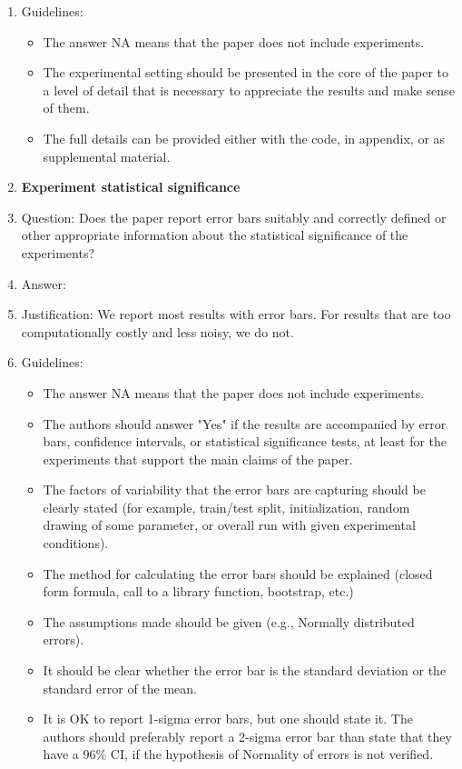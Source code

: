 \documentclass{article}
\begin{document}
\begin{enumerate}
    \item[] Guidelines:
    \begin{itemize}
        \item The answer NA means that the paper does not include experiments.
        \item The experimental setting should be presented in the core of the paper to a level of detail that is necessary to appreciate the results and make sense of them.
        \item The full details can be provided either with the code, in appendix, or as supplemental material.
    \end{itemize}
\item {\bf Experiment statistical significance}
    \item[] Question: Does the paper report error bars suitably and correctly defined or other appropriate information about the statistical significance of the experiments?
    \item[] Answer: \answerYes{}
    \item[] Justification: We report most results with error bars. For results that are too computationally costly and less noisy, we do not.
    \item[] Guidelines:
    \begin{itemize}
        \item The answer NA means that the paper does not include experiments.
        \item The authors should answer "Yes" if the results are accompanied by error bars, confidence intervals, or statistical significance tests, at least for the experiments that support the main claims of the paper.
        \item The factors of variability that the error bars are capturing should be clearly stated (for example, train/test split, initialization, random drawing of some parameter, or overall run with given experimental conditions).
        \item The method for calculating the error bars should be explained (closed form formula, call to a library function, bootstrap, etc.)
        \item The assumptions made should be given (e.g., Normally distributed errors).
        \item It should be clear whether the error bar is the standard deviation or the standard error of the mean.
        \item It is OK to report 1-sigma error bars, but one should state it. The authors should preferably report a 2-sigma error bar than state that they have a 96\% CI, if the hypothesis of Normality of errors is not verified.

\end{itemize}
\end{enumerate}
\end{document}
